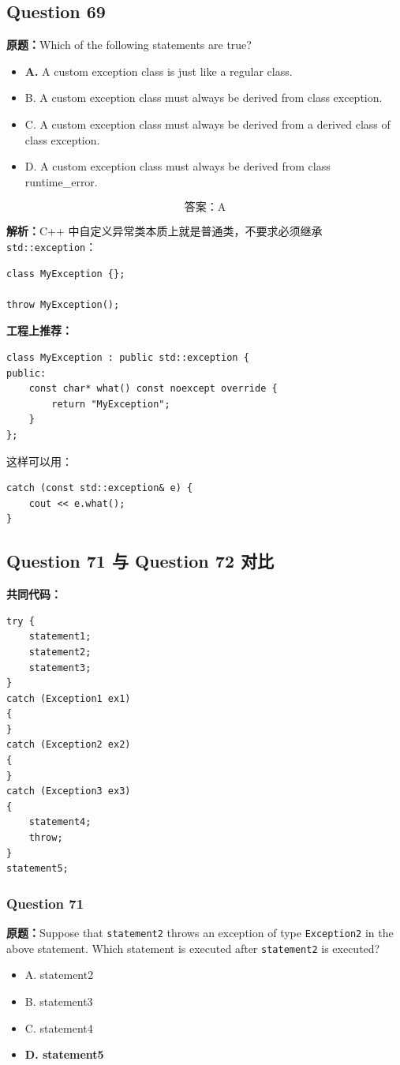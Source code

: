 \documentclass[11pt, a4paper]{article}
\begin{document}
\subsection*{Question 69}
\textbf{原题：}Which of the following statements are true?
\begin{itemize}
    \item \textbf{A.} A custom exception class is just like a regular class.
    \item B. A custom exception class must always be derived from class exception.
    \item C. A custom exception class must always be derived from a derived class of class exception.
    \item D. A custom exception class must always be derived from class runtime\_error.
\end{itemize}

\[
\boxed{\text{答案：A}}
\]

\textbf{解析：}C++ 中自定义异常类本质上就是普通类，不要求必须继承 \texttt{std::exception}：
\begin{lstlisting}
class MyException {};

throw MyException();
\end{lstlisting}

\textbf{工程上推荐：}
\begin{lstlisting}
class MyException : public std::exception {
public:
    const char* what() const noexcept override {
        return "MyException";
    }
};
\end{lstlisting}
这样可以用：
\begin{lstlisting}
catch (const std::exception& e) {
    cout << e.what();
}
\end{lstlisting}


\subsection*{Question 71 与 Question 72 对比}
\textbf{共同代码：}
\begin{lstlisting}
try {
    statement1;
    statement2;
    statement3;
}
catch (Exception1 ex1)
{
}
catch (Exception2 ex2)
{
}
catch (Exception3 ex3)
{
    statement4;
    throw;
}
statement5;
\end{lstlisting}

\subsubsection*{Question 71}
\textbf{原题：}Suppose that \texttt{statement2} throws an exception of type \texttt{Exception2} in the above statement. Which statement is executed after \texttt{statement2} is executed?
\begin{itemize}
    \item A. statement2
    \item B. statement3
    \item C. statement4
    \item \textbf{D. statement5}
\end{itemize}
\end{document}
